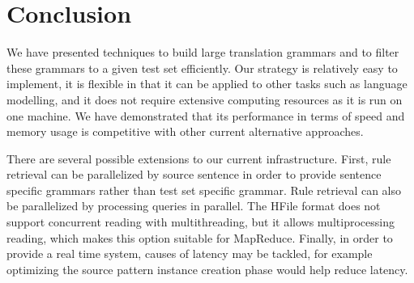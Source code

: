 \section{Conclusion}
\label{sec:conclusion}

We have presented techniques to build large translation
grammars and to filter these grammars to a given test set efficiently.
Our strategy is relatively easy to implement, it is
flexible in that it can be applied to other tasks such as language modelling,
and it does not require extensive computing resources as it is run on one
machine. We have demonstrated that its performance in terms of speed and memory
usage is competitive with other current alternative approaches.

There are several possible extensions to our current infrastructure.
First, rule retrieval can be parallelized by source sentence in order
to provide sentence specific grammars rather than test set specific
grammar. Rule retrieval can also be parallelized by
processing queries in parallel. The HFile format does not support
concurrent reading with multithreading, but it allows multiprocessing
reading, which makes this option suitable for MapReduce.
Finally, in order to provide a real time system, causes of latency
may be tackled, for example optimizing the source pattern instance
creation phase would help reduce latency.
